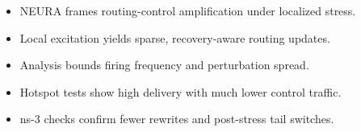 \begin{itemize}
\item NEURA frames routing-control amplification under localized stress.
\item Local excitation yields sparse, recovery-aware routing updates.
\item Analysis bounds firing frequency and perturbation spread.
\item Hotspot tests show high delivery with much lower control traffic.
\item ns-3 checks confirm fewer rewrites and post-stress tail switches.
\end{itemize}
